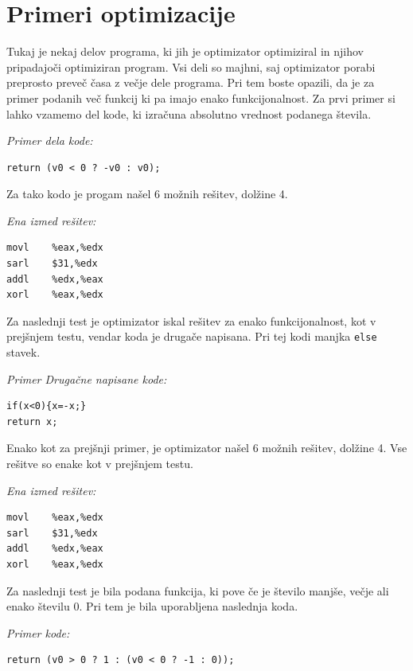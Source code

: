 \documentclass[a4paper, 12pt]{book}
\begin{document}
		\section{Primeri optimizacije}
	\label{priG}
	Tukaj je nekaj delov programa, ki jih je optimizator optimiziral in njihov pripadajoči optimiziran program. Vsi deli so majhni, saj optimizator porabi preprosto preveč časa z večje dele programa. Pri tem boste opazili, da je za primer podanih več funkcij ki pa imajo enako funkcijonalnost. Za prvi primer si lahko vzamemo del kode, ki izračuna absolutno vrednost podanega števila.
	
	\medskip
	
	\noindent
	{\it Primer dela kode:}
\begin{Verbatim}[baselinestretch=1]
return (v0 < 0 ? -v0 : v0);
\end{Verbatim}
	
	Za tako kodo je progam našel 6 možnih rešitev, dolžine 4.

\medskip
		
\noindent
{\it Ena izmed rešitev:}
\begin{Verbatim}[baselinestretch=1]
movl    %eax,%edx    
sarl    $31,%edx
addl    %edx,%eax
xorl    %eax,%edx
\end{Verbatim}

	Za naslednji test je optimizator iskal rešitev za enako funkcijonalnost, kot v prejšnjem testu, vendar koda je drugače napisana. Pri tej kodi manjka \texttt{else} stavek.
	
\medskip

\noindent
{\it Primer Drugačne napisane kode:}
\begin{Verbatim}[baselinestretch=1]
if(x<0){x=-x;}
return x;
\end{Verbatim}

	Enako kot za prejšnji primer, je optimizator našel 6 možnih rešitev, dolžine 4. Vse rešitve so enake kot v prejšnjem testu.
	
\medskip
		
\noindent
{\it Ena izmed rešitev:}
\begin{Verbatim}[baselinestretch=1]
movl    %eax,%edx
sarl    $31,%edx
addl    %edx,%eax
xorl    %eax,%edx
\end{Verbatim}

	Za naslednji test je bila podana funkcija, ki pove če je število manjše, večje ali enako številu 0. Pri tem je bila uporabljena naslednja koda.

	
\medskip
	
\noindent
{\it Primer kode:}
\begin{Verbatim}[baselinestretch=1]
return (v0 > 0 ? 1 : (v0 < 0 ? -1 : 0));
\end{Verbatim}
\end{document}
